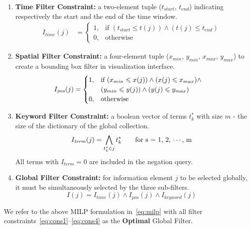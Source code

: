 \begin{enumerate}
\item {\bf Time Filter Constraint:} a two-element tuple ($t_{start}$, $t_{end}$) indicating respectively the start and the end of the time window.
\begin{equation}
\begin{aligned}
  I_{\mathit{time}}(j) &=
   \begin{cases}
     1, & \text{if $(t_{start} \leqslant t(j)) \land (t(j) \leqslant t_{end})$}  \\
     0, & \text{otherwise}
  \end{cases} \label{eq:cons1}
\end{aligned}
\end{equation}

\item {\bf Spatial Filter Constraint:} a four-element tuple ($x_{min}$, $y_{min}$, $x_{max}$, $y_{max}$) to create a bounding box filter in visualization interface.
\begin{equation}
\begin{aligned}
I_{\mathit{pos}}(j) & =\begin{cases}
1, & \text{if \ensuremath{(x_{min}\leqslant x(j))\land(x(j)\leqslant x_{max})\land}}\\
 & (y_{min}\leqslant y(j))\land(y(j)\leqslant y_{max})\\
0, & \text{otherwise}
\end{cases} \label{eq:cons2}
\end{aligned}
\end{equation}

\item {\bf Keyword Filter Constraint:} a boolean vector of terms $t^*_k$ with size $m$ - the size of the dictionary of the global collection.
\begin{equation}
  I_{\mathit{term}}(j) = \bigwedge_{t^*_k \in j} t^*_k \qquad \textnormal{for s = 1, 2, $\cdots$, m} \label{eq:cons3}
\end{equation}
All terms with $I_{\mathit{term}}=0$ are included in the negation query.


\item {\bf Global Filter Constraint:} for information element $j$ to be selected globally, it must be simultaneously selected by the three sub-filters.
\begin{equation}
  I(j) = I_{\mathit{time}}(j) \land I_{\mathit{pos}}(j) \land I_{\mathit{keyword}}(j) \label{eq:cons4}
\end{equation}

\end{enumerate}
We refer to the above MILP formulation in~\eqref{eq:milp} with all filter constraints~\eqref{eq:cons1}--\eqref{eq:cons4} as the {\bf Optimal} Global Filter.

